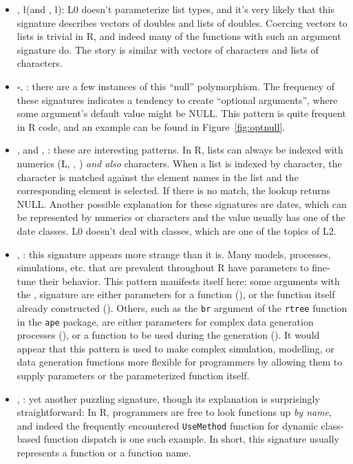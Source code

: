 \documentclass[acmsmall,10pt,review,anonymous]{acmart}\settopmatter{printfolios=true,printccs=false,printacmref=false}
\begin{document}
\begin{itemize}
\item \D, \l (and \C, \l): L0 doesn't parameterize list types, and it's very likely that this signature describes vectors of doubles and lists of doubles.
	Coercing vectors to lists is trivial in R, and indeed many of the functions with such an argument signature do.
	The story is similar with vectors of characters and lists of characters.
	
	\item $\square$, \sN: there are a few instances of this ``null'' polymorphism.
	The frequency of these signatures indicates a tendency to create ``optional arguments'', where some argument's default value might be NULL.
	This pattern is quite frequent in R code, and an example can be found in Figure~\ref{fig:optnull}.

	\item \C, \D and \C, \I: these are interesting patterns.
	In R, lists can always be indexed with numerics (\L, \D, \I) {\it and also} characters.
	When a list is indexed by character, the character is matched against the element names in the list and the corresponding element is selected.
	If there is no match, the lookup returns NULL.
	Another possible explanation for these signatures are dates, which can be represented by numerics or characters and the value usually has one of the date classes.
	L0 doesn't deal with classes, which are one of the topics of L2.

	\item \D, \sF: this signature appears more strange than it is.
	Many models, processes, simulations, etc. that are prevalent throughout R have parameters to fine-tune their behavior.
	This pattern manifests itself here: some arguments with the \D, \sF signature are either parameters for a function (\D), or the function itself already constructed (\sF).
	Others, such as the {\tt br} argument of the {\tt rtree} function in the {\tt ape} package, are either parameters for complex data generation processes (\D), or a function to be used during the generation (\sF).
	It would appear that this pattern is used to make complex simulation, modelling, or data generation functions more flexible for programmers by allowing them to supply parameters or the parameterized function itself.
	
	\item \C, \sF: yet another puzzling signature, though its explanation is surprisingly straightforward:
	In R, programmers are free to look functions up {\it by name}, and indeed the frequently encountered {\tt UseMethod} function for dynamic class-based function dispatch is one such example.
	In short, this signature usually represents a function or a function name.
\end{itemize}
\end{document}
